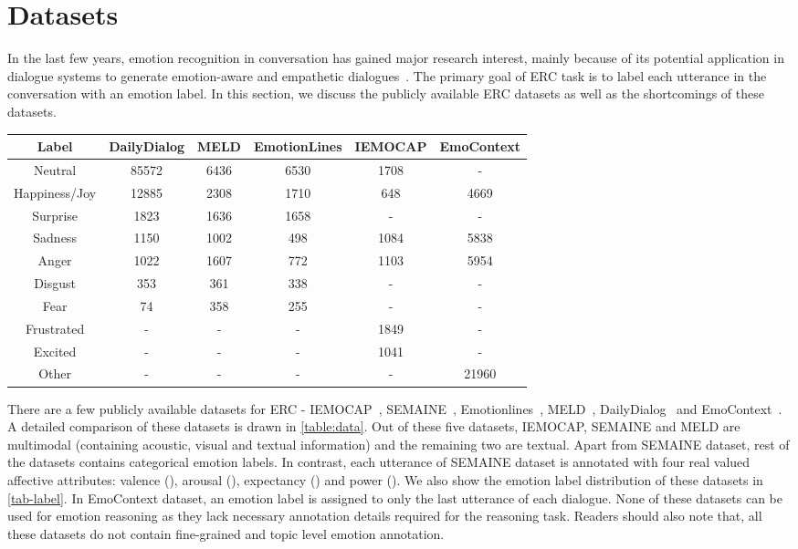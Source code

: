 \documentclass{IEEEtran}\usepackage[pdftex]{graphicx}
\begin{document}
	\section{Datasets}
	\label{sec:datasets}
	In the last few years, emotion recognition in conversation has gained major research interest, mainly because of its potential application in dialogue systems to generate emotion-aware and empathetic dialogues~\citep{zhou2018emotional}. The primary goal of ERC task is to label each utterance in the conversation with an emotion label. In this section, we discuss the publicly available ERC datasets as well as the shortcomings of these datasets.
	\begin{table*}[t]
		\centering
		\begin{tabular}{cccccc}
			\toprule
			
			Label & DailyDialog & MELD & EmotionLines & IEMOCAP & EmoContext\\
			\midrule
			Neutral & 85572 & 6436 & 6530 & 1708 & -\\
			Happiness/Joy & 12885 & 2308 & 1710 & 648 & 4669\\
			Surprise & 1823 & 1636 & 1658 & - & -\\
			Sadness & 1150 & 1002 & 498 & 1084 & 5838\\
			Anger & 1022 & 1607 & 772 & 1103 & 5954\\
			Disgust & 353 & 361 & 338 & - & -\\
			Fear & 74 & 358 & 255 & - & -\\
			Frustrated & - & - & - & 1849 & -\\
			Excited & - & - & - & 1041 & -\\
			Other & - & - & - & - & 21960\\
			\bottomrule
		\end{tabular}
		\caption{Label distribution statistics in different Emotion Recognition datasets.}
		\label{tab-label}
	\end{table*}
	There are a few publicly available datasets for ERC - IEMOCAP~\citep{busso2008iemocap}, SEMAINE~\citep{mckeown2012semaine}, Emotionlines~\citep{chen2018emotionlines}, MELD~\citep{poria2018meld}, DailyDialog~\citep{li2017dailydialog} and EmoContext~\citep{chatterjee2019understanding}. A detailed comparison of these datasets is drawn in \cref{table:data}. Out of these five datasets, IEMOCAP, SEMAINE and MELD are multimodal (containing acoustic, visual and textual information) and the remaining two are textual. Apart from SEMAINE dataset, rest of the datasets contains categorical emotion labels. In contrast, each utterance of SEMAINE dataset is annotated with
	four real valued affective attributes: valence (), arousal (),
	expectancy () and power ().  We also show the emotion label distribution of these datasets in \cref{tab-label}. In EmoContext dataset, an emotion label is assigned to only the last utterance of each dialogue.
	None of these datasets can be used for emotion reasoning as they lack necessary annotation details required for the reasoning task. Readers should also note that, all these datasets do not contain fine-grained and topic level emotion annotation.
	
\end{document}
